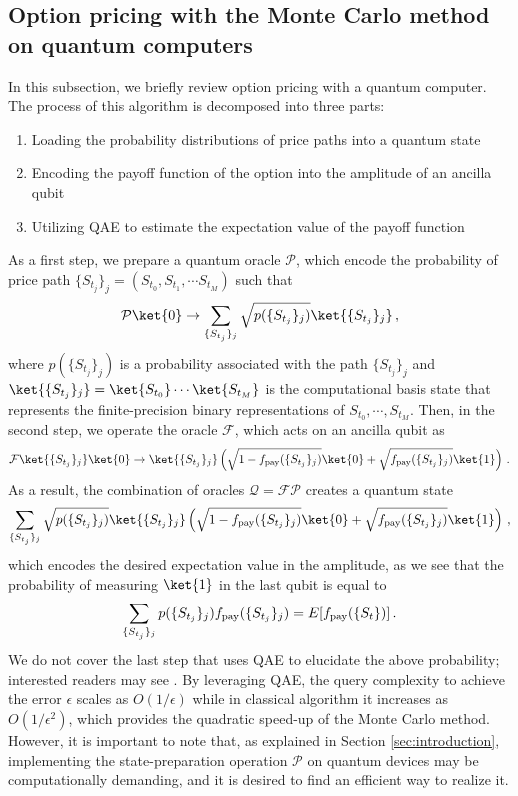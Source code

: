 {\subsection{Option pricing with the Monte Carlo method on quantum computers}
In this subsection, we briefly review option pricing with a quantum computer.
The process of this algorithm is decomposed into three parts:
\begin{enumerate}
    \item Loading the probability distributions of price paths into a quantum state
    \item Encoding the payoff function of the option into the amplitude of an ancilla qubit
    \item Utilizing QAE to estimate the expectation value of the payoff function
\end{enumerate}
As a first step, we prepare a quantum oracle $\mathcal{P}$, which encode the probability of price path $\{S_{t_j}\}_j = (S_{t_0}, S_{t_1}, \cdots S_{t_M})$ such that 
\begin{align}
    \mathcal{P} \ket{0} \rightarrow \sum_{\{S_{t_j}\}_j} \sqrt{p(\{S_{t_j}\}_j)} \ket{\{S_{t_j}\}_j} \, ,
\end{align}
where $p(\{S_{t_j}\}_j)$ is a probability associated with the path $\{S_{t_j}\}_j$ and $\ket{\{S_{t_j}\}_j}=\ket{S_{t_0}}\cdots\ket{S_{t_M}}$ is the computational basis state that represents the finite-precision binary representations of $S_{t_0},\cdots,S_{t_M}$.
Then, in the second step, we operate the oracle $\mathcal{F}$, which acts on an ancilla qubit as 
\begin{align}
    \mathcal{F}\ket{\{S_{t_j}\}_j} \ket{0} \rightarrow \ket{\{S_{t_j}\}_j}  \left(\sqrt{1-f_{\rm pay}(\{S_{t_j}\}_j)} \ket{0} + \sqrt{f_{\rm pay}(\{S_{t_j}\}_j)} \ket{1}  \right) \, .
\end{align}
As a result, the combination of oracles $\mathcal{Q} = \mathcal{F} \mathcal{P}$ creates a quantum state
\begin{align}
    \sum_{\{S_{t_j}\}_j} \sqrt{p(\{S_{t_j}\}_j)} \ket{\{S_{t_j}\}_j}\left(\sqrt{1-f_{\rm pay}(\{S_{t_j}\}_j)} \ket{0} + \sqrt{f_{\rm pay}(\{S_{t_j}\}_j)} \ket{1}  \right) \, ,
\end{align}
which encodes the desired expectation value in the amplitude, as we see that the probability of measuring $\ket{1}$ in the last qubit is equal to 
\begin{align}
    \sum_{ \{S_{t_j}\}_j}p(\{S_{t_j}\}_j) f_{\rm pay}( \{S_{t_j}\}_j) = E [f_{\rm pay} (\{S_t\})] \, .
\end{align}
We do not cover the last step that uses QAE to elucidate the above probability; interested readers may see \cite{rebentrost2018quantum,stamatopoulos2020option}.
By leveraging QAE, the query complexity to achieve the error $\epsilon$ scales as $O(1/\epsilon)$ while in classical algorithm it increases as $O(1/\epsilon^2)$, which provides the quadratic speed-up of the Monte Carlo method.
However, it is important to note that, as explained in Section \ref{sec:introduction}, implementing the state-preparation operation $\mathcal{P}$ on quantum devices may be computationally demanding, and it is desired to find an efficient way to realize it. 


}
